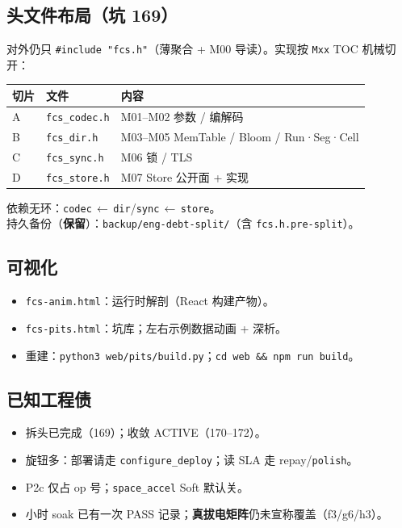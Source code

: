 \subsection{头文件布局（坑 169）}
对外仍只 \texttt{\#include "fcs.h"}（薄聚合 + M00 导读）。实现按 \texttt{Mxx} TOC 机械切开：
\begin{center}
\begin{tabular}{@{}lll@{}}
\toprule
切片 & 文件 & 内容 \\
\midrule
A & \texttt{fcs\_codec.h} & M01--M02 参数 / 编解码 \\
B & \texttt{fcs\_dir.h} & M03--M05 MemTable / Bloom / Run·Seg·Cell \\
C & \texttt{fcs\_sync.h} & M06 锁 / TLS \\
D & \texttt{fcs\_store.h} & M07 Store 公开面 + 实现 \\
\bottomrule
\end{tabular}
\end{center}
依赖无环：\texttt{codec}$\,\leftarrow\,$\texttt{dir}/\texttt{sync}$\,\leftarrow\,$\texttt{store}。\\
持久备份（\textbf{保留}）：\texttt{backup/eng-debt-split/}（含 \texttt{fcs.h.pre-split}）。

\subsection{可视化}
\begin{itemize}[leftmargin=1.6em]
  \item \texttt{fcs-anim.html}：运行时解剖（React 构建产物）。
  \item \texttt{fcs-pits.html}：坑库；左右示例数据动画 + 深析。
  \item 重建：\texttt{python3 web/pits/build.py}；\texttt{cd web \&\& npm run build}。
\end{itemize}

\subsection{已知工程债}
\begin{itemize}[leftmargin=1.6em]
  \item 拆头已完成（169）；收敛 ACTIVE（170--172）。
  \item 旋钮多：部署请走 \texttt{configure\_deploy}；读 SLA 走 repay/\texttt{polish}。
  \item P2c 仅占 op 号；\texttt{space\_accel} Soft 默认关。
  \item 小时 soak 已有一次 PASS 记录；\textbf{真拔电矩阵}仍未宣称覆盖（f3/g6/h3）。
\end{itemize}
